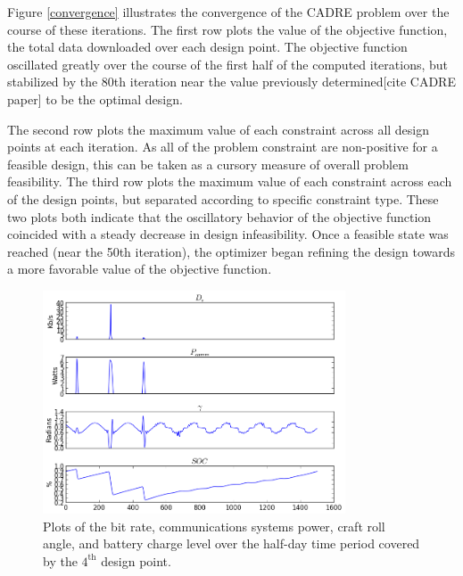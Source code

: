 \documentclass[]{aiaa-tc} %
\begin{document}
Figure \ref{convergence} illustrates the convergence of the CADRE problem over the course of
these iterations. The first row plots the
value of the objective function, the total data downloaded over each design point. The objective
function oscillated greatly over the course of the first half of the computed iterations, but
stabilized by the 80th iteration near the value previously determined[cite CADRE paper]
to be the optimal design.

The second row plots the maximum value of each constraint across all design points at
each iteration. As all of the problem constraint are non-positive for a feasible design,
this can be taken as a cursory measure of overall problem feasibility.
The third row plots the maximum value of each constraint across each of the design points,
but separated according to specific constraint type. These two plots both indicate that the
oscillatory behavior of the objective function coincided with a steady decrease in design
infeasibility. Once a feasible state was reached (near the 50th iteration), the optimizer
began refining the design towards a more favorable value of the objective function.

\begin{figure}
\centering
\includegraphics[width=0.8\textwidth]{images/pt_3_data.png}
\caption[width=0.4\textwidth]{Plots of the bit rate, communications systems power, craft roll angle,
and battery charge level over the half-day time period covered by the $4^{\textrm{th}}$ design point.}
\label{pt3_data_results}
\end{figure}
\end{document}

